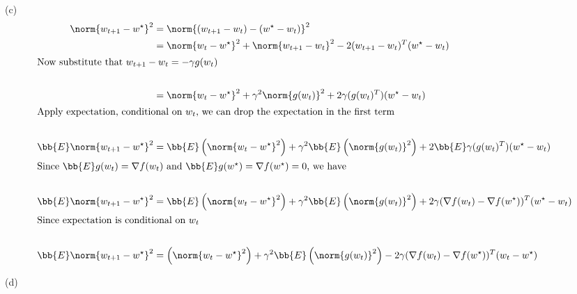 \documentclass[../main.tex]{subfiles}
\begin{document}
(c)\\

\begin{align*}
    \norm{w_{t+1} - w^{\star}}^2 &= \norm{(w_{t+1} - w_{t}) - (w^{\star} - w_{t})}^2 \\
    &= \norm{w_{t} - w^{\star}}^2 + \norm{w_{t+1} - w_{t}}^2 - 2(w_{t+1}-w_{t})^T(w^{\star} - w_{t}) \\
    \intertext{Now substitute that $w_{t+1} - w_{t} = - \gamma g(w_{t})$} \\
    &= \norm{w_{t} - w^{\star}}^2 + \gamma^2\norm{g(w_t)}^2 + 2\gamma(g(w_t)^T)(w^{\star} - w_{t}) \\
    \intertext{Apply expectation, conditional on $w_t$, we can drop the expectation in the first term} \\
    \bb{E} \norm{w_{t+1} - w^{\star}}^2 &= \bb{E}\left( \norm{w_{t} - w^{\star}}^2 \right) + \gamma^2 \bb{E}\left( \norm{g(w_t)}^2 \right) + 2 \bb{E}\gamma(g(w_t)^T)(w^{\star} - w_{t}) \\
    \intertext{Since $\bb{E}g(w_t) = \nabla f(w_t)$ and $\bb{E}g(w^{\star}) = \nabla f(w^{\star}) = 0$, we have } \\
    \bb{E} \norm{w_{t+1} - w^{\star}}^2 &= \bb{E}\left( \norm{w_{t} - w^{\star}}^2 \right) + \gamma^2 \bb{E}\left( \norm{g(w_t)}^2 \right) + 2\gamma (\nabla f(w_t) - \nabla f(w^{\star}))^T(w^{\star} - w_{t}) \\
    \intertext{Since expectation is conditional on $w_t$} \\
    \bb{E} \norm{w_{t+1} - w^{\star}}^2 &= \left( \norm{w_{t} - w^{\star}}^2 \right) + \gamma^2 \bb{E}\left( \norm{g(w_t)}^2 \right) - 2\gamma (\nabla f(w_t) - \nabla f(w^{\star}))^T(w_{t} - w^{\star}) \\
\end{align*}

(d) \\
\end{document}
